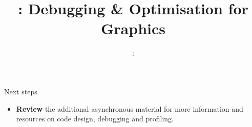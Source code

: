 \usepackage{../../beamerthemeFalmouthGamesAcademy}
\usepackage{multimedia}
\graphicspath{ {../../} }




\usepackage[normalem]{ulem}
\usepackage{wasysym}

\usepackage{pdfpages}

\usepackage{caption}
\captionsetup[figure]{font=scriptsize,labelfont=scriptsize}

\usetikzlibrary{arrows,automata}




\title{\sessionnumber: Debugging \& Optimisation for Graphics}
\subtitle{\modulecode: \moduletitle}

\frame{\titlepage} 







\begin{frame}{Next steps}
	\begin{itemize}
		\item \textbf{Review} the additional asynchronous material for more information and resources on code design, debugging and profiling.
	\end{itemize}
\end{frame}



